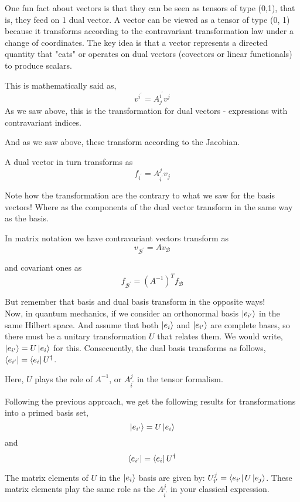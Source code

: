 One fun fact about vectors is that they can be seen as tensors of type (0,1), that is, they feed
on 1 dual vector.
A vector can be viewed as a tensor of type (0, 1) because it transforms according to the contravariant
transformation law under a change of coordinates. The key idea is that a vector represents a directed
quantity that "eats" or operates on dual vectors (covectors or linear functionals) to produce scalars.

This is mathematically said as,
$$
v^{i^\prime} = A^{i^\prime}_{j} v^j
$$
As we saw above, this is the transformation for dual vectors - expressions with contravariant indices.

And as we saw above, these transform according to the Jacobian.

A dual vector in turn transforms as
$$
f_{i^\prime} = A_{i^\prime}^{j} v_j
$$

Note how the transformation are the contrary to what we saw for the basis vectors!
Where as the components of the dual vector transform in the same way as the basis.

In matrix notation we have contravariant vectors transform as
$$
v_{\mathcal{B}^\prime} = A v_{\mathcal{B}}
$$

and covariant ones as
$$
f_{\mathcal{B}^\prime} = \left( A^{-1} \right)^T f_{\mathcal{B}}
$$

But remember that basis and dual basis transform in the opposite ways!
\\


Now, in quantum mechanics, if we consider an orthonormal basis ${\ket{e_{i^{\prime}}}}$ in the same Hilbert space.
And assume that both ${\ket{e_i}}$ and ${\ket{e_{i^{\prime}}}}$ are complete bases,
so there must be a unitary transformation $U$ that relates them.
We would write, $\ket{e_{i^{\prime}}} = U \ket{e_i}$ for this.
Consecuently, the dual basis transforms as follows, $\bra{ e_{i^\prime} } = \bra{e_i} U^\dagger $.

Here, $U$ plays the role of $A^{-1}$, or $A_{i^{\prime}}^{j}$ in the tensor formalism.

Following the previous approach, we get the following results for transformations into a primed basis set,
$$
\ket{e_{i^{\prime}}} = U \ket{e_i}
$$
and
$$
\bra{ e_{i^\prime} } = \bra{e_i} U^\dagger
$$

The matrix elements of $U$ in the $\ket{e_i}$ basis are given by:
$U_{i^{\prime}}^{j} = \bra{e_{i^{\prime}}} U \ket{e_j}$.
These matrix elements play the same role as the $A_{i^{\prime}}^{j}$ in your classical expression.






